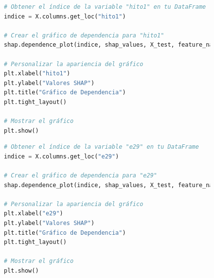 \begin{figure}[ht]
    \centering
    \begin{minipage}{0.48\textwidth}
        \begin{lstlisting}[language=Python, caption=Grafico de dependencia hito1, label=lst:grafDepHito1]
# Obtener el índice de la variable "hito1" en tu DataFrame
indice = X.columns.get_loc("hito1")

# Crear el gráfico de dependencia para "hito1"
shap.dependence_plot(indice, shap_values, X_test, feature_names=X.columns, show=False)

# Personalizar la apariencia del gráfico
plt.xlabel("hito1")
plt.ylabel("Valores SHAP")
plt.title("Gráfico de Dependencia")
plt.tight_layout()

# Mostrar el gráfico
plt.show()
        \end{lstlisting}
    \end{minipage}
    \hfill
    \begin{minipage}{0.48\textwidth}
        \begin{lstlisting}[language=Python, caption=Grafico de dependencia e29, label=lst:grafDepE29]
# Obtener el índice de la variable "e29" en tu DataFrame
indice = X.columns.get_loc("e29")

# Crear el gráfico de dependencia para "e29"
shap.dependence_plot(indice, shap_values, X_test, feature_names=X.columns, show=False)

# Personalizar la apariencia del gráfico
plt.xlabel("e29")
plt.ylabel("Valores SHAP")
plt.title("Gráfico de Dependencia")
plt.tight_layout()

# Mostrar el gráfico
plt.show()
        \end{lstlisting}
    \end{minipage}
\end{figure}

